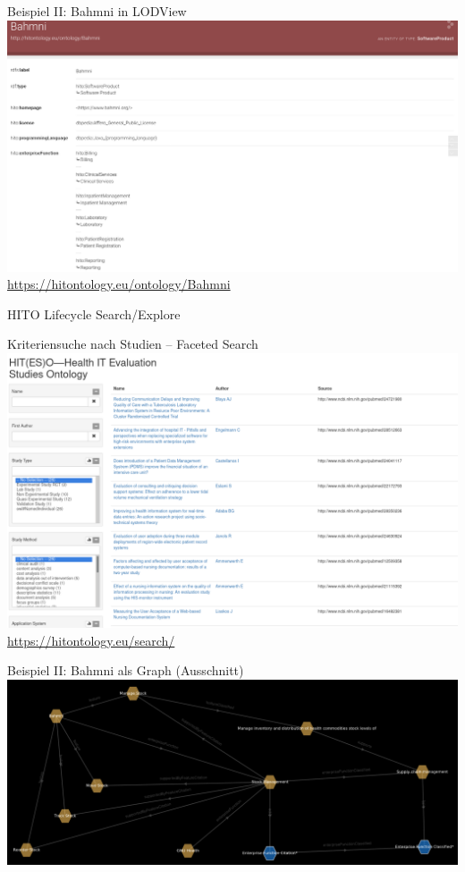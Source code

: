 \documentclass[aspectratio=1610,12pt]{beamer}
\begin{document}
\begin{frame}{Beispiel II: Bahmni in LODView}
\vspace{-0.3cm}
\centering
\includegraphics[width=.95\textwidth]{img/bahmni.png}
\footnotesize{\url{https://hitontology.eu/ontology/Bahmni}}
\end{frame}

\begin{frame}{HITO Lifecycle Search/Explore}
  \centering
  \vspace{-0.5cm}
\end{frame}

\begin{frame}{Kriteriensuche nach Studien -- Faceted Search}
\centering
\vspace{-0.3cm}
\includegraphics[height=.8\textheight]{img/facetedsearch.png}
\vspace{0.3cm}
\footnotesize{\url{https://hitontology.eu/search/}}
\end{frame}

\begin{frame}{Beispiel II: Bahmni als Graph (Ausschnitt)}
  \includegraphics[width=\textwidth, height=.65\textheight]{img/bahmni_star.png}
\end{frame}
\end{document}
